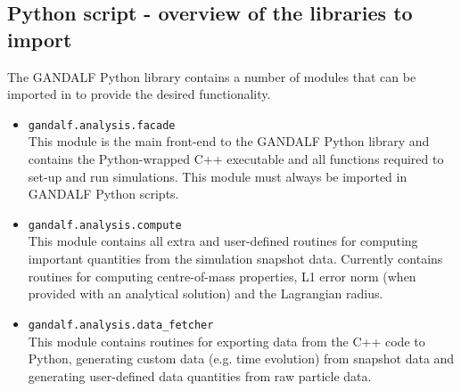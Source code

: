 \documentclass[a4paper]{article}
\begin{document}
\subsection{Python script - overview of the libraries to import}
The GANDALF Python library contains a number of modules that can be imported in to provide the desired functionality.
\begin{itemize}
\item \lstinline[columns=fixed]{gandalf.analysis.facade} \\
\noindent This module is the main front-end to the GANDALF Python library and contains the Python-wrapped C++ executable and all functions required to set-up and run simulations.  This module must always be imported in GANDALF Python scripts.
\item \lstinline{gandalf.analysis.compute} \\
\noindent This module contains all extra and user-defined routines for computing important quantities from the simulation snapshot data.  Currently contains routines for computing centre-of-mass properties, L1 error norm (when provided with an analytical solution) and the Lagrangian radius.
\item \lstinline{gandalf.analysis.data_fetcher} \\
This module contains routines for exporting data from the C++ code to Python, generating custom data (e.g. time evolution) from snapshot data and generating user-defined data quantities from raw particle data.
\end{itemize}





\end{document}
